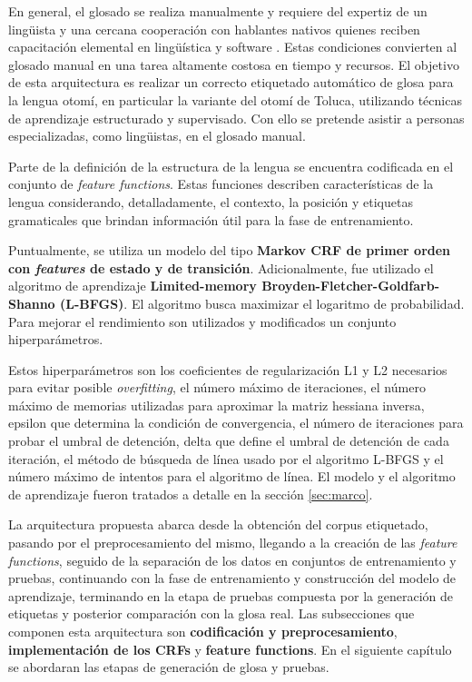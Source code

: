 \documentclass[letterpaper,12pt,oneside]{book}
\theoremstyle{definition}
\begin{document}
En general, el glosado se realiza manualmente y requiere del expertiz de un lingüista y una cercana cooperación con hablantes nativos quienes reciben capacitación elemental en lingüística y software \citep{moeller2018automatic}. Estas condiciones convierten al glosado manual en una tarea altamente costosa en tiempo y recursos. El objetivo de esta arquitectura es realizar un correcto etiquetado automático de glosa para la lengua otomí, en particular la variante del otomí de Toluca, utilizando técnicas de aprendizaje estructurado y supervisado. Con ello se pretende asistir a personas especializadas, como lingüistas, en el glosado manual.   

Parte de la definición de la estructura de la lengua se encuentra codificada en el conjunto de \textit{feature functions}. Estas funciones describen características de la lengua considerando, detalladamente, el contexto, la posición y etiquetas gramaticales que brindan información útil para la fase de entrenamiento.

Puntualmente, se utiliza un modelo del tipo \textbf{Markov CRF de primer orden con \textit{features} de estado y de transición}. Adicionalmente, fue utilizado el algoritmo de aprendizaje \textbf{Limited-memory Broyden-Fletcher-Goldfarb-Shanno (L-BFGS)}. El algoritmo busca maximizar el logaritmo de probabilidad. Para mejorar el rendimiento son utilizados y modificados un conjunto hiperparámetros.

Estos hiperparámetros son los coeficientes de regularización L1 y L2 necesarios para evitar posible \textit{overfitting}, el número máximo de iteraciones, el número máximo de memorias utilizadas para aproximar la matriz hessiana inversa, epsilon que determina la condición de convergencia, el número de iteraciones para probar el umbral de detención,  delta que define el umbral de detención de cada iteración, el método de búsqueda de línea usado por el algoritmo L-BFGS y el número máximo de intentos para el algoritmo de línea.
El modelo y el algoritmo de aprendizaje fueron tratados a detalle en la sección \ref{sec:marco}.

La arquitectura propuesta abarca desde la obtención del corpus etiquetado, pasando por el preprocesamiento del mismo, llegando a la creación de las \textit{feature functions}, seguido de la separación de los datos en conjuntos de entrenamiento y pruebas, continuando con la fase de entrenamiento y construcción del modelo de aprendizaje, terminando en la etapa de pruebas compuesta por la generación de etiquetas y posterior comparación con la glosa real. Las subsecciones que componen esta arquitectura son \textbf{codificación y preprocesamiento}, \textbf{implementación de los CRFs} y \textbf{feature functions}. En el siguiente capítulo se abordaran las etapas de generación de glosa y pruebas.
\end{document}
